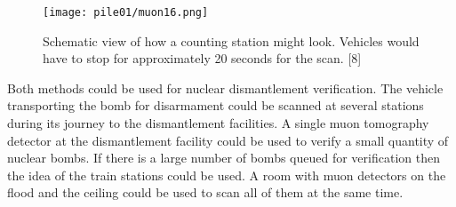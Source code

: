 \documentclass[twocolumn,a4paper]{article}
\begin{document}
\begin{figure}
  \texttt{[image: pile01/muon16.png]}
  \caption{Schematic view of how a counting station might look. Vehicles would have to stop for
approximately 20 seconds for the scan. [8]}
  \label{muon16}
\end{figure}

Both methods could be used for nuclear dismantlement verification. The vehicle transporting the
bomb for disarmament could be scanned at several stations during its journey to the dismantlement
facilities. A single muon tomography detector at the dismantlement facility could be used to verify a
small quantity of nuclear bombs. If there is a large number of bombs queued for verification then
the idea of the train stations could be used. A room with muon detectors on the flood and the ceiling
could be used to scan all of them at the same time.
\end{document}
